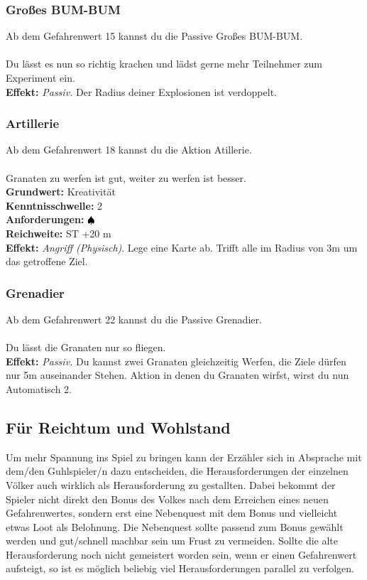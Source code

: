 \subsubsection*{ Großes BUM-BUM} \label{sk:GrosesBUMBUM}
Ab dem Gefahrenwert 15 kannst du die Passive Großes BUM-BUM. \\
\\
Du lässt es nun so richtig krachen und lädst gerne mehr Teilnehmer zum Experiment ein.\\
\textbf{Effekt:} \textit{Passiv.} Der Radius deiner Explosionen ist verdoppelt.

\subsubsection*{ Artillerie} \label{sk:artillerie!}
Ab dem Gefahrenwert 18 kannst du die Aktion Atillerie. \\
\\
Granaten zu werfen ist gut, weiter zu werfen ist besser.\\
\textbf{Grundwert:} Kreativität \\
\textbf{Kenntnisschwelle:} 2 \\
\textbf{Anforderungen:} ${\color{blue} }{\color{black}\spadesuit}$ \\
\textbf{Reichweite:} ST +20 m \\
\textbf{Effekt:} \textit{Angriff (Physisch)}. Lege eine Karte ab. Trifft alle im Radius von 3m um das getroffene Ziel.

\subsubsection*{ Grenadier} \label{sk:Grenafier}
Ab dem Gefahrenwert 22 kannst du die Passive Grenadier. \\
\\
Du lässt die Granaten nur so fliegen.\\
\textbf{Effekt:} \textit{Passiv.} Du kannst zwei Granaten gleichzeitig Werfen, die Ziele dürfen nur 5m auseinander Stehen. Aktion in denen du Granaten wirfst, wirst du nun Automatisch 2.  

\subsection*{Für Reichtum und Wohlstand}
Um mehr Spannung ins Spiel zu bringen kann der Erzähler sich in Absprache mit dem/den Guhlspieler/n dazu entscheiden, die Herausforderungen der einzelnen Völker auch wirklich als Herausforderung zu gestallten. Dabei bekommt der Spieler nicht direkt den Bonus des Volkes nach dem Erreichen eines neuen Gefahrenwertes, sondern erst eine Nebenquest mit dem Bonus und vielleicht etwas Loot als Belohnung.
Die Nebenquest sollte passend zum Bonus gewählt werden und gut/schnell machbar sein um Frust zu vermeiden. Sollte die alte Herausforderung noch nicht gemeistert worden sein, wenn er einen Gefahrenwert aufsteigt, so ist es möglich beliebig viel Herausforderungen parallel zu verfolgen.

